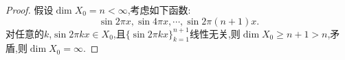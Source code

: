 \documentclass[a4paper,oneside,12pt]{ctexart}
\theoremstyle{plain}
\theoremstyle{nonumberplain}
\theoremstyle{nonumberplain}
\newtheorem{proof}{证明.}
\begin{document}
    \begin{proof}
        假设$\dim X_0=n<\infty$,考虑如下函数:
        \begin{equation*}
            \sin 2\pi x,\sin 4\pi x,\cdots,\sin 2\pi(n+1)x.
        \end{equation*}
        对任意的$k$,$\sin 2\pi kx\in X_0$,且$\{\sin 2\pi kx\}_{k=1}^{n+1}$线性无关,则$\dim X_0\geqslant n+1>n$,矛盾,则$\dim X_0=\infty$.
    \end{proof}
\end{document}
